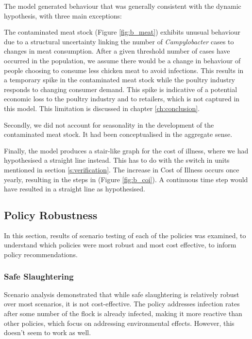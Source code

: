 The model generated behaviour that was generally consistent with the dynamic hypothesis, with three main exceptions:

The contaminated meat stock (Figure \ref{fig:b_meat}) exhibits unusual behaviour due to a structural uncertainty linking the number of \textit{Campylobacter} cases to changes in meat consumption. After a given threshold number of cases have occurred in the population, we assume there would be a change in behaviour of people choosing to consume less chicken meat to avoid infections. This results in a temporary spike in the contaminated meat stock while the poultry industry responds to changing consumer demand. This spike is indicative of a potential economic loss to the poultry industry and to retailers, which is not captured in this model. This limitation is discussed in chapter \ref{ch:conclusion}.

Secondly, we did not account for seasonality in the development of the contaminated meat stock. It had been conceptualised in the aggregate sense. 

Finally, the model produces a stair-like graph for the cost of illness, where we had hypothesised a straight line instead. This has to do with the switch in units mentioned in section \ref{s:verification}. The increase in Cost of Illness occurs once yearly, resulting in the steps in (Figure \ref{fig:b_coi}). A continuous time step would have resulted in a straight line as hypothesised. 

\subsection{Policy Robustness}
In this section, results of scenario testing of each of the policies was examined, to understand which policies were most robust and most cost effective, to inform policy recommendations.

\subsubsection{Safe Slaughtering}
\label{sec: safe slaughtering}
Scenario analysis demonstrated that while safe slaughtering is relatively robust over most scenarios, it is not cost-effective. The policy addresses infection rates after some number of the flock is already infected, making it more reactive than other policies, which focus on addressing environmental effects. However, this doesn't seem to work as well. 

